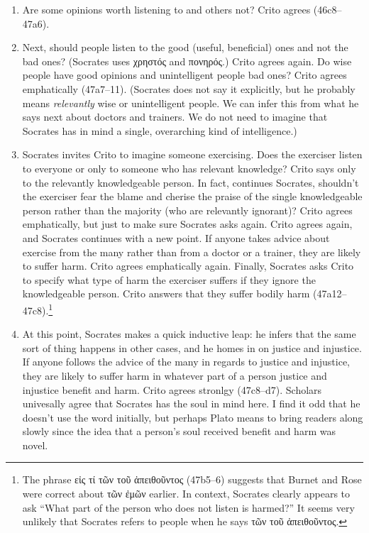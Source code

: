 \documentclass[12pt,letterpaper]{article}
\begin{document}
\begin{enumerate}

    \item Are some opinions worth listening to and others not? Crito agrees (46c8--47a6).

    \item Next, should people listen to the good (useful, beneficial) ones and not the bad ones? (Socrates uses \textgreek{χρηστός} and \textgreek{πονηρός}.) Crito agrees again. Do wise people have good opinions and unintelligent people bad ones? Crito agrees emphatically (47a7--11). (Socrates does not say it explicitly, but he probably means \textit{relevantly} wise or unintelligent people. We can infer this from what he says next about doctors and trainers. We do not need to imagine that Socrates has in mind a single, overarching kind of intelligence.)

    \item Socrates invites Crito to imagine someone exercising. Does the exerciser listen to everyone or only to someone who has relevant knowledge? Crito says only to the relevantly knowledgeable person. In fact, continues Socrates, shouldn't the exerciser fear the blame and cherise the praise of the single knowledgeable person rather than the majority (who are relevantly ignorant)? Crito agrees emphatically, but just to make sure Socrates asks again. Crito agrees again, and Socrates continues with a new point. If anyone takes advice about exercise from the many rather than from a doctor or a trainer, they are likely to suffer harm. Crito agrees emphatically again. Finally, Socrates asks Crito to specify what type of harm the exerciser suffers if they ignore the knowledgeable person. Crito answers that they suffer bodily harm (47a12--47c8).\footnote{The phrase \textgreek{εἰς τί τῶν τοῦ ἀπειθοῦντος} (47b5--6) suggests that Burnet and Rose were correct about \textgreek{τῶν ἐμῶν} earlier. In context, Socrates clearly appears to ask ``What part of the person who does not listen is harmed?'' It seems very unlikely that Socrates refers to people when he says \textgreek{τῶν τοῦ ἀπειθοῦντος}.}

    \item At this point, Socrates makes a quick inductive leap: he infers that the same sort of thing happens in other cases, and he homes in on justice and injustice. If anyone follows the advice of the many in regards to justice and injustice, they are likely to suffer harm in whatever part of a person justice and injustice benefit and harm. Crito agrees stronlgy (47c8--d7). Scholars univesally agree that Socrates has the soul in mind here. I find it odd that he doesn't use the word initially, but perhaps Plato means to bring readers along slowly since the idea that a person's soul received benefit and harm was novel.


\end{enumerate}
\end{document}
